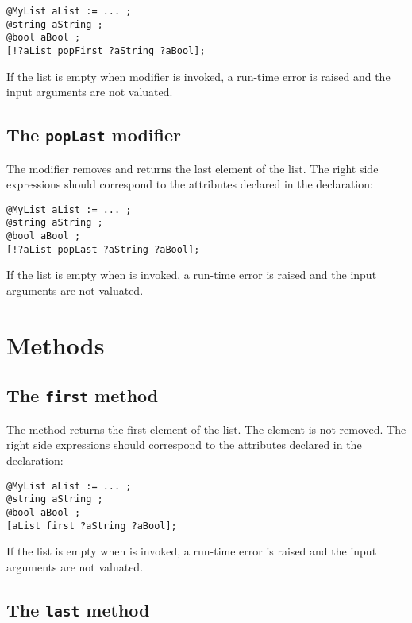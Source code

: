 \begin{lstlisting}[language=galgas]
@MyList aList := ... ;
@string aString ;
@bool aBool ;
[!?aList popFirst ?aString ?aBool];
\end{lstlisting}

If the list is empty when  modifier is invoked, a run-time error is raised and the input arguments are not valuated.

\subsection{The \texttt{popLast} modifier}


The  modifier removes and returns the last element of the list. The right side expressions should correspond to the attributes declared in the  declaration:

\begin{lstlisting}[language=galgas]
@MyList aList := ... ;
@string aString ;
@bool aBool ;
[!?aList popLast ?aString ?aBool];
\end{lstlisting}

If the list is empty when  is invoked, a run-time error is raised and the input arguments are not valuated.

\section{Methods}

\subsection{The \texttt{first} method}

The  method returns the first element of the list. The element is not removed. The right side expressions should correspond to the attributes declared in the  declaration:

\begin{lstlisting}[language=galgas]
@MyList aList := ... ;
@string aString ;
@bool aBool ;
[aList first ?aString ?aBool];
\end{lstlisting}

If the list is empty when  is invoked, a run-time error is raised and the input arguments are not valuated.

\subsection{The \texttt{last} method}


